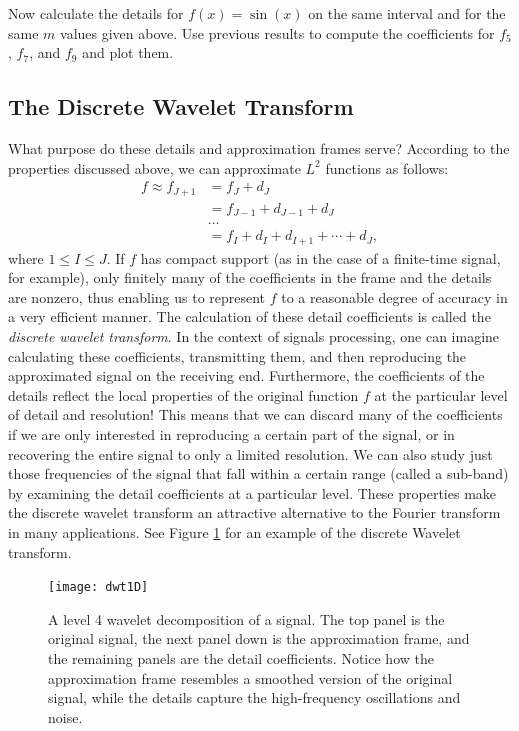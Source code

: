 \begin{problem}
Now calculate the details for $f(x) = \sin(x)$ on the same interval and for the
same $m$ values given above. Use previous results to compute the coefficients
for $f_5$, $f_7$, and $f_9$ and plot them.
\end{problem}

\subsection*{The Discrete Wavelet Transform}

What purpose do these details and approximation frames serve? According to the
properties discussed above, we can approximate $L^2$ functions as follows:
\begin{align*}
f \approx f_{J+1} &= f_J + d_J \\
&= f_{J-1} + d_{J-1} + d_J \\
& \ldots\\
&= f_{I} + d_{I} + d_{I+1} + \cdots + d_J,
\end{align*}
where $1 \leq I \leq J$. If $f$ has compact support (as in the case of a finite-time signal,
for example), only finitely many of the coefficients in the frame and the details are
nonzero, thus enabling us to represent $f$ to a reasonable degree of accuracy in a very
efficient manner. The calculation of these detail coefficients is called the \emph{discrete
wavelet transform}. In the context of signals processing, one can imagine calculating these
coefficients, transmitting them, and then reproducing the approximated signal on the
receiving end. Furthermore, the coefficients of the details reflect the local properties
of the original function $f$ at the particular level of detail and resolution! This means
that we can discard many of the coefficients if we are only interested in reproducing a certain
part of the signal, or in recovering the entire signal to only a limited resolution. We can
also study just those frequencies of the signal that fall within a certain range (called a
sub-band) by examining the detail coefficients at a particular level. These
properties make the discrete wavelet transform an attractive alternative to the Fourier
transform in many applications. See Figure \ref{fig:dwt1D} for an example of the discrete Wavelet transform.

\begin{figure}
\centering
\texttt{[image: dwt1D]}
\caption{A level 4 wavelet decomposition of a signal. The top panel is the original signal,
the next panel down is the approximation frame, and the remaining panels are the detail coefficients.
Notice how the approximation frame resembles a smoothed version of the original signal, while the 
details capture the high-frequency oscillations and noise.}
\label{fig:dwt1D}
\end{figure}

